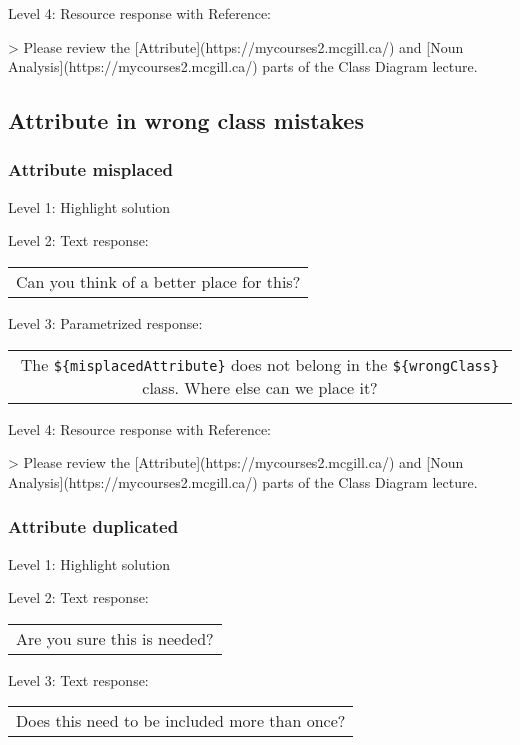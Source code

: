\noindent Level 4: Resource response with Reference:

> Please review the [Attribute](https://mycourses2.mcgill.ca/) and [Noun Analysis](https://mycourses2.mcgill.ca/) parts of the Class Diagram lecture.


\subsection{Attribute in wrong class mistakes}

\subsubsection{Attribute misplaced}

\noindent Level 1: Highlight solution \medskip

\noindent Level 2: Text response: \medskip

\begin{tabular}{|c}
Can you think of a better place for this?
\end{tabular} \medskip

\noindent Level 3: Parametrized response: \medskip

\begin{tabular}{|c}
The \verb|${misplacedAttribute}| does not belong in the \verb|${wrongClass}| class. Where else can we place it?
\end{tabular} \medskip

\noindent Level 4: Resource response with Reference:

> Please review the [Attribute](https://mycourses2.mcgill.ca/) and [Noun Analysis](https://mycourses2.mcgill.ca/) parts of the Class Diagram lecture.


\subsubsection{Attribute duplicated}

\noindent Level 1: Highlight solution \medskip

\noindent Level 2: Text response: \medskip

\begin{tabular}{|c}
Are you sure this is needed?
\end{tabular} \medskip

\noindent Level 3: Text response: \medskip

\begin{tabular}{|c}
Does this need to be included more than once?
\end{tabular} \medskip

